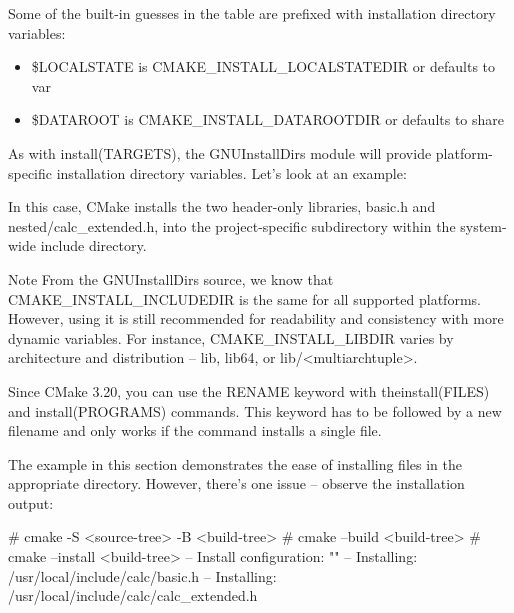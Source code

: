 Some of the built-in guesses in the table are prefixed with installation directory variables:

\begin{itemize}
\item
\$LOCALSTATE is CMAKE\_INSTALL\_LOCALSTATEDIR or defaults to var

\item
\$DATAROOT is CMAKE\_INSTALL\_DATAROOTDIR or defaults to share
\end{itemize}

As with install(TARGETS), the GNUInstallDirs module will provide platform-specific installation directory variables. Let’s look at an example:



In this case, CMake installs the two header-only libraries, basic.h and nested/calc\_extended.h, into the project-specific subdirectory within the system-wide include directory.

\begin{myNotic}{Note}
From the GNUInstallDirs source, we know that CMAKE\_INSTALL\_INCLUDEDIR is the same for all supported platforms. However, using it is still recommended for readability and consistency with more dynamic variables. For instance, CMAKE\_INSTALL\_LIBDIR varies by architecture and distribution – lib, lib64, or lib/<multiarchtuple>.
\end{myNotic}

Since CMake 3.20, you can use the RENAME keyword with theinstall(FILES) and install(PROGRAMS) commands. This keyword has to be followed by a new filename and only works if the command installs a single file.

The example in this section demonstrates the ease of installing files in the appropriate directory. However, there’s one issue – observe the installation output:

\begin{shell}
# cmake -S <source-tree> -B <build-tree>
# cmake --build <build-tree>
# cmake --install <build-tree>
-- Install configuration: ""
-- Installing: /usr/local/include/calc/basic.h
-- Installing: /usr/local/include/calc/calc_extended.h
\end{shell}

